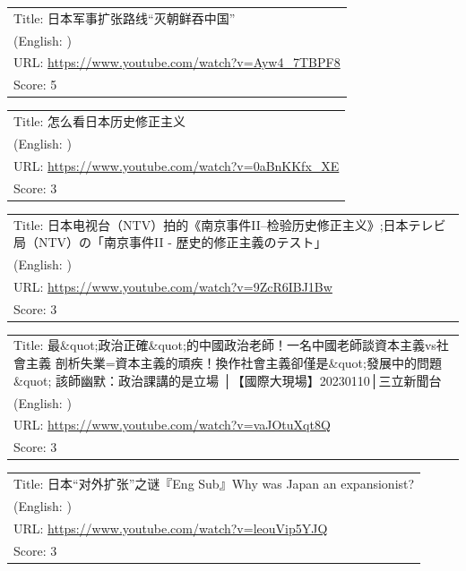 \documentclass{article}
\begin{document}
\noindent
\begin{tabular}{p{}}
Title: 日本军事扩张路线“灭朝鲜吞中国” \\
(English: ) \\
URL: \url{https://www.youtube.com/watch?v=Ayw4_7TBPF8} \\
Score: 5 \\
\end{tabular}
\vspace{0.5em}

\noindent
\begin{tabular}{p{}}
Title: 怎么看日本历史修正主义 \\
(English: ) \\
URL: \url{https://www.youtube.com/watch?v=0aBnKKfx_XE} \\
Score: 3 \\
\end{tabular}
\vspace{0.5em}

\noindent
\begin{tabular}{p{}}
Title: 日本电视台（NTV）拍的《南京事件II--检验历史修正主义》;日本テレビ局（NTV）の「南京事件II - 歴史的修正主義のテスト」 \\
(English: ) \\
URL: \url{https://www.youtube.com/watch?v=9ZcR6IBJ1Bw} \\
Score: 3 \\
\end{tabular}
\vspace{0.5em}

\noindent
\begin{tabular}{p{}}
Title: 最\&quot;政治正確\&quot;的中國政治老師！一名中國老師談資本主義vs社會主義 剖析失業=資本主義的頑疾！換作社會主義卻僅是\&quot;發展中的問題\&quot; 該師幽默：政治課講的是立場 │【國際大現場】20230110│三立新聞台 \\
(English: ) \\
URL: \url{https://www.youtube.com/watch?v=vaJOtuXqt8Q} \\
Score: 3 \\
\end{tabular}
\vspace{0.5em}

\noindent
\begin{tabular}{p{}}
Title: 日本“对外扩张”之谜『Eng Sub』Why was Japan an expansionist? \\
(English: ) \\
URL: \url{https://www.youtube.com/watch?v=leouVip5YJQ} \\
Score: 3 \\
\end{tabular}
\vspace{0.5em}
\end{document}
